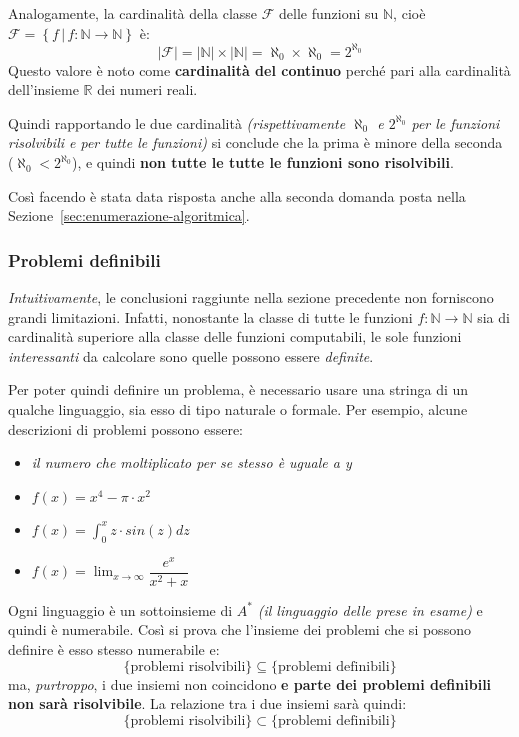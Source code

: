 \documentclass[italian, 10pt]{article}
\begin{document}
Analogamente, la cardinalità della classe \(\mathscr{F}\) delle funzioni su \(\mathbb{N}\), cioè \(\mathscr{F} = \left\{ f \, | \, f: \mathbb{N} \rightarrow \mathbb{N} \right\}\) è:
\[ |\mathscr{F}| = |\mathbb{N}| \times |\mathbb{N}| = \aleph_0 \times \aleph_0 = 2^{\aleph_0} \]
Questo valore è noto come \textbf{cardinalità del continuo} perché pari alla cardinalità dell'insieme \(\mathbb{R}\) dei numeri reali.

Quindi rapportando le due cardinalità \textit{(rispettivamente \(\aleph_0\) e \(2^{\aleph_0}\) per le funzioni risolvibili e per tutte le funzioni)} si conclude che la prima è minore della seconda (\(\aleph_0 < 2^{\aleph_0}\)), e quindi \textbf{non tutte le tutte le funzioni sono risolvibili}.

\bigskip
Così facendo è stata data risposta anche alla seconda domanda posta nella Sezione~\ref{sec:enumerazione-algoritmica}.

\subsubsection{Problemi definibili}

\textit{Intuitivamente}, le conclusioni raggiunte nella sezione precedente non forniscono grandi limitazioni.
Infatti, nonostante la classe di tutte le funzioni \(f: \mathbb{N} \rightarrow \mathbb{N}\) sia di cardinalità superiore alla classe delle funzioni computabili, le sole funzioni \textit{interessanti} da calcolare sono quelle possono essere \textit{definite}.

Per poter quindi definire un problema, è necessario usare una stringa di un qualche linguaggio, sia esso di tipo naturale o formale.
Per esempio, alcune descrizioni di problemi possono essere:

\begin{itemize}
  \item \textit{il numero che moltiplicato per se stesso è uguale a y}
  \item \(f(x) = x^4- \pi \cdot x^2\)
  \item \(\displaystyle f(x) = \int_0^x z \cdot sin(z) dz\)
  \item \(f(x) = \displaystyle \lim_{x \rightarrow \infty} \dfrac{e^x}{x^2+x}\)
\end{itemize}

Ogni linguaggio è un sottoinsieme di \(A^\ast\) \textit{(il linguaggio delle \UTM prese in esame)} e quindi è numerabile.
Così si prova che l'insieme dei problemi che si possono definire è esso stesso numerabile e:
\[ \{\text{problemi risolvibili}\} \subseteq \{\text{problemi definibili}\}\]
ma, \textit{purtroppo}, i due insiemi non coincidono \textbf{e parte dei problemi definibili non sarà risolvibile}.
La relazione tra i due insiemi sarà quindi:
\[ \{\text{problemi risolvibili}\} \subset \{\text{problemi definibili}\}\]
\end{document}
